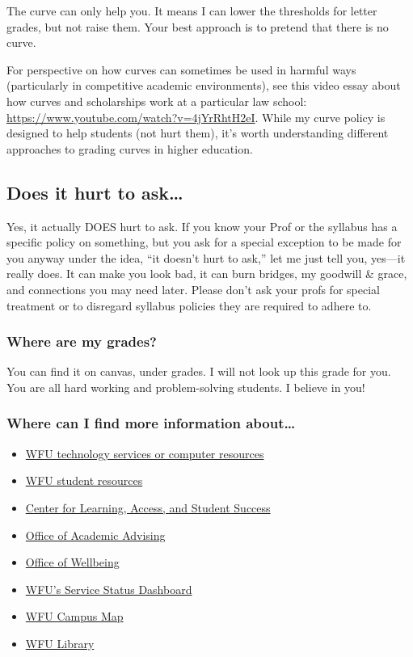 \documentclass[
]{book}
\providecommand{\tightlist}{%
  \setlength{\itemsep}{0pt}\setlength{\parskip}{0pt}}
\begin{document}
The curve can only help you. It means I can lower the thresholds for letter grades, but not raise them. Your best approach is to pretend that there is no curve.

For perspective on how curves can sometimes be used in harmful ways (particularly in competitive academic environments), see this video essay about how curves and scholarships work at a particular law school: \url{https://www.youtube.com/watch?v=4jYrRhtH2eI}. While my curve policy is designed to help students (not hurt them), it's worth understanding different approaches to grading curves in higher education.

\subsection{Does it hurt to ask\ldots{}}\label{does-it-hurt-to-ask-1}

Yes, it actually DOES hurt to ask. If you know your Prof or the syllabus has a specific policy on something, but you ask for a special exception to be made for you anyway under the idea, ``it doesn't hurt to ask,'' let me just tell you, yes---it really does. It can make you look bad, it can burn bridges, my goodwill \& grace, and connections you may need later. Please don't ask your profs for special treatment or to disregard syllabus policies they are required to adhere to.

\subsubsection{Where are my grades?}\label{where-are-my-grades-1}

You can find it on canvas, under grades. I will not look up this grade for you. You are all hard working and problem-solving students. I believe in you!

\subsubsection{Where can I find more information about\ldots{}}\label{where-can-i-find-more-information-about}

\begin{itemize}
\tightlist
\item
  \href{https://is.wfu.edu/student/}{WFU technology services or computer resources}
\item
  \href{https://college.wfu.edu/student-resources/}{WFU student resources}
\item
  \href{https://class.wfu.edu/}{Center for Learning, Access, and Student Success}
\item
  \href{https://advising.wfu.edu/}{Office of Academic Advising}
\item
  \href{https://thrive.wfu.edu/}{Office of Wellbeing}
\item
  \href{https://status.is.wfu.edu/}{WFU's Service Status Dashboard}
\item
  \href{https://map.wfu.edu/}{WFU Campus Map}
\item
  \href{https://zsr.wfu.edu/}{WFU Library}
\end{itemize}
\end{document}
